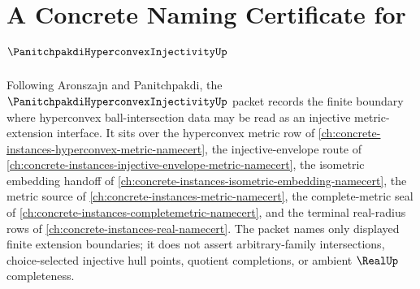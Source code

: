 \chapter{A Concrete Naming Certificate for $\PanitchpakdiHyperconvexInjectivityUp$}
\label{ch:concrete-instances-panitchpakdi-hyperconvex-injectivity-namecert}

Following Aronszajn and Panitchpakdi, the $\PanitchpakdiHyperconvexInjectivityUp$ packet records the finite boundary where hyperconvex ball-intersection data may be read as an injective metric-extension interface. It sits over the hyperconvex metric row of \autoref{ch:concrete-instances-hyperconvex-metric-namecert}, the injective-envelope route of \autoref{ch:concrete-instances-injective-envelope-metric-namecert}, the isometric embedding handoff of \autoref{ch:concrete-instances-isometric-embedding-namecert}, the metric source of \autoref{ch:concrete-instances-metric-namecert}, the complete-metric seal of \autoref{ch:concrete-instances-completemetric-namecert}, and the terminal real-radius rows of \autoref{ch:concrete-instances-real-namecert}. The packet names only displayed finite extension boundaries; it does not assert arbitrary-family intersections, choice-selected injective hull points, quotient completions, or ambient $\RealUp$ completeness.

